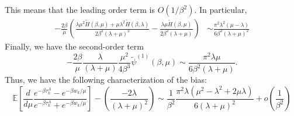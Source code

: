 This means that the leading order term is $O(1/\beta^{2})$. In particular,
\begin{align*}
-\frac{2\beta}{\mu}\left(\frac{\lambda\mu^{2}\tilde{H}(\beta,\mu)+\mu\lambda^{2}\tilde{H}(\beta,\lambda)}{2\beta^{2}(\lambda+\mu)^{2}}-\frac{\lambda\mu\tilde{H}(\beta,\mu)}{2\beta^{2}(\lambda+\mu)}\right) & \sim\frac{\pi^{2}\lambda^{2}(\mu-\lambda)}{6\beta^{2}(\lambda+\mu)^{2}}
\end{align*}
Finally, we have the second-order term
\[
-\frac{2\beta}{\mu}\frac{\lambda}{(\lambda+\mu)}\frac{\mu^{2}}{4\beta^{3}}\tilde{\psi}^{(1)}(\beta,\mu)\sim\frac{\pi^{2}\lambda\mu}{6\beta^{2}(\lambda+\mu)}.
\]
Thus, we have the following characterization of the bias:
\[
\mathbb{E}\left[\frac{d}{d\mu}\frac{e^{-\beta \tau_k^A}-e^{-\beta w_k/\mu}}{e^{-\beta \tau_k^A}+e^{-\beta w_k/\mu}}\right]-\left(\frac{-2\lambda}{(\lambda+\mu)^{2}}\right)\sim\frac{1}{\beta^{2}}\frac{\pi^{2}\lambda(\mu^{2}-\lambda^{2}+2\mu\lambda)}{6(\lambda+\mu)^{2}}+o\left(\frac{1}{\beta^{2}}\right)
\]

